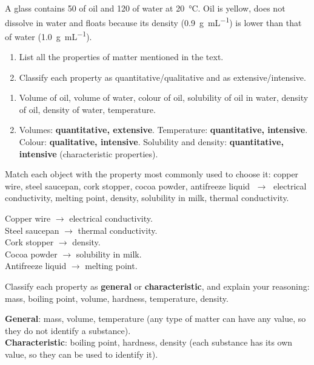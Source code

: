 \begin{exercise}
    A glass contains \qty{50}{\cmcubicos} of oil and \qty{120}{\cmcubicos} of water at \qty{20}{\celsius}. Oil is yellow, does not dissolve in water and floats because its density (\qty{0.9}{\g\per\mL}) is lower than that of water (\qty{1.0}{\g\per\mL}).
    \begin{enumerate}[label=\letraminuscula]
        \item List all the properties of matter mentioned in the text.
        \item Classify each property as quantitative/qualitative and as extensive/intensive.
    \end{enumerate}
    \begin{solu}
        \begin{enumerate}[label=\alph*)]
            \item Volume of oil, volume of water, colour of oil, solubility of oil in water, density of oil, density of water, temperature.
            \item Volumes: \textbf{quantitative, extensive}. Temperature: \textbf{quantitative, intensive}. Colour: \textbf{qualitative, intensive}. Solubility and density: \textbf{quantitative, intensive} (characteristic properties).
        \end{enumerate}
    \end{solu}
\end{exercise}

\begin{exercise}
    Match each object with the property most commonly used to choose it: copper wire, steel saucepan, cork stopper, cocoa powder, antifreeze liquid \(\;\to\;\) electrical conductivity, melting point, density, solubility in milk, thermal conductivity.
    \begin{solu}
        Copper wire \(\to\) electrical conductivity. \\
        Steel saucepan \(\to\) thermal conductivity. \\
        Cork stopper \(\to\) density. \\
        Cocoa powder \(\to\) solubility in milk. \\
        Antifreeze liquid \(\to\) melting point.
    \end{solu}
\end{exercise}

\begin{exercise}
    Classify each property as \textbf{general} or \textbf{characteristic}, and explain your reasoning: mass, boiling point, volume, hardness, temperature, density.
    \begin{solu}
        \textbf{General}: mass, volume, temperature (any type of matter can have any value, so they do not identify a substance). \\
        \textbf{Characteristic}: boiling point, hardness, density (each substance has its own value, so they can be used to identify it).
    \end{solu}
\end{exercise}

